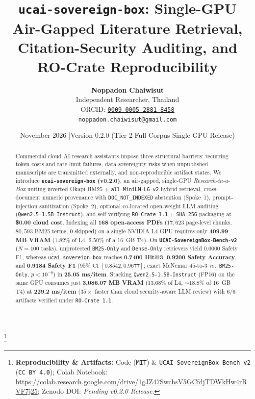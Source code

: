 \documentclass[10pt,twocolumn]{article}
\title{\textbf{\texttt{ucai-sovereign-box}: Single-GPU Air-Gapped Literature Retrieval, Citation-Security Auditing, and RO-Crate Reproducibility}}
\author{
  \textbf{Noppadon Chaiwisut} \\
  Independent Researcher, Thailand \\
  ORCID: \href{https://orcid.org/0009-0005-2881-8458}{\texttt{0009-0005-2881-8458}} \\
  \texttt{noppadon.chaiwisut@gmail.com}
}
\date{November 2026 \quad|\quad Version 0.2.0 (Tier-2 Full-Corpus Single-GPU Release)}
\begin{document}
\maketitle
\thispagestyle{plain}
\begingroup
\renewcommand\thefootnote{}\footnote{\noindent\textbf{Reproducibility \& Artifacts:} Code (\texttt{MIT}) \& \texttt{UCAI-SovereignBox-Bench-v2} (\texttt{CC BY 4.0}); Colab Notebook: \url{https://colab.research.google.com/drive/1gJZ47SwcbsV5GCfdjTDWkHw4rRVF7j25}; Zenodo DOI: \textit{Pending v0.2.0 Release}.}
\addtocounter{footnote}{-1}
\endgroup

\begin{abstract}
Commercial cloud AI research assistants impose three structural barriers: recurring token costs and rate-limit failures, data-sovereignty risks when unpublished manuscripts are transmitted externally, and non-reproducible artifact states. We introduce \textbf{\texttt{ucai-sovereign-box} (v0.2.0)}, an air-gapped, single-GPU \emph{Research-in-a-Box} uniting inverted Okapi BM25 + \texttt{all-MiniLM-L6-v2} hybrid retrieval, cross-document numeric provenance with \texttt{DOC\_NOT\_INDEXED} abstention (Spoke~1), prompt-injection sanitization (Spoke~2), optional co-located open-weight LLM auditing (\texttt{Qwen2.5-1.5B-Instruct}), and self-verifying \texttt{RO-Crate 1.1} + \texttt{SHA-256} packaging at \textbf{\$0.00 cloud cost}. Indexing all \textbf{168 open-access PDFs} ($17{,}623$ page-level chunks, $80{,}593$ BM25 terms, $0$ skipped) on a single NVIDIA L4 GPU requires only \textbf{409.99 MB VRAM} ($1.82\%$ of L4, $2.50\%$ of a 16~GB T4). On \textbf{\texttt{UCAI-SovereignBox-Bench-v2}} ($N = 100$ tasks), unprotected \texttt{BM25-Only} and \texttt{Dense-Only} retrievers yield $0.0000$ Safety F1, whereas \texttt{ucai-sovereign-box} reaches \textbf{0.7400 Hit@3}, \textbf{0.9200 Safety Accuracy}, and \textbf{0.9184 Safety F1} ($95\%\text{ CI } [0.8542, 0.9677]$; exact McNemar $45$-to-$3$ vs.\ \texttt{BM25-Only}, $p < 10^{-8}$) in \textbf{25.05 ms/item}. Stacking \texttt{Qwen2.5-1.5B-Instruct} (FP16) on the same GPU consumes just \textbf{3,086.07 MB VRAM} ($13.68\%$ of L4, $\sim 18.8\%$ of 16~GB T4) at \textbf{229.2 ms/item} ($35\times$ faster than cloud security-aware LLM review) with $6/6$ artifacts verified under \texttt{RO-Crate 1.1}.
\end{abstract}
\end{document}
